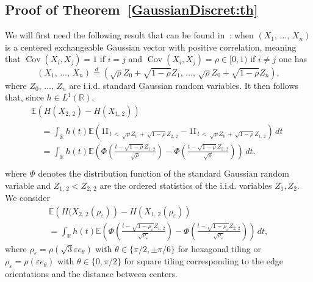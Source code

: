 \documentclass[10pt]{amsart}
\theoremstyle{definition}\newtheorem{defi}[theo]{Definition}\newtheorem{rema}[theo]{Remark}\newtheorem{exam}[theo]{Example}\newtheorem{exem}[theo]{Example}\newtheorem{nota}[theo]{Notation}
\newcommand{\R}{\mathbb{R}}
\newcommand{\E}{\mathbb{E}}
\newcommand{\ind}{{1\!\!\mathrm{I}}}
\newcommand{\eps}{\varepsilon}
\DeclareMathOperator{\Cov}{Cov}
\begin{document}
\subsection{Proof of Theorem~\ref{GaussianDiscret:th}}\label{App:GaussianDiscret:th}



We will first need the following result that can be found in~\cite[p.~139]{Tong90}: when $(X_1,\,\ldots,\,X_n)$ is a centered exchangeable Gaussian vector with positive correlation, meaning that $\Cov(X_i,X_j)=1$ if $i=j$ and $\Cov(X_i,X_j)=\rho \in [0,1)$ if $i\neq j$ one has
\[
\left(X_1,\,\ldots,\,X_n\right)\stackrel{d}{=}\left(\sqrt{\rho}Z_0+\sqrt{1-\rho}Z_1,\,\ldots,\,\sqrt{\rho}Z_0+\sqrt{1-\rho}Z_n\right),
\]
where $Z_0,\,\ldots,\,Z_n$ are i.i.d. standard Gaussian random variables. It then follows that, since $h\in L^1(\R)$,
\begin{multline*}
\E\left(H(X_{2,\,2}) - H(X_{1,\,2})\right)\\
\begin{aligned}
& = \int_\R h(t) \E \left(
\ind_{\,t\,<\,\sqrt{\rho}Z_0\,+\,\sqrt{1-\rho}Z_{2,\,2}}-\ind_{\,t\,<\,\sqrt{\rho}Z_0\,+\,\sqrt{1-\rho}Z_{1,\,2}}\right) \, dt \\
& = \int_\R h(t) \E\left(\Phi\left(\frac{t-\sqrt{1-\rho}Z_{1,\,2}}{\sqrt{\rho}}\right)-\Phi\left(\frac{t-\sqrt{1-\rho}Z_{2,\,2}}{\sqrt{\rho}}\right)\right)\,dt,\\
\end{aligned}
\end{multline*}
where $\Phi$ denotes the distribution function of the standard Gaussian random variable and $Z_{1,\,2}<Z_{2,\,2}$ are the ordered statistics of the i.i.d. variables $Z_1, Z_2$.\\
We consider
\begin{multline*}
\E\left(H(X_{2,\,2}(\rho_\eps)\right) - H\left(X_{1,\,2}(\rho_\eps)\right)
\\
=\int_\R h(t) \E\left(\Phi\left(\frac{t-\sqrt{1-\rho_\eps}Z_{1,\,2}}{\sqrt{\rho_\eps}}\right)-\Phi\left(\frac{t-\sqrt{1-\rho_\eps}Z_{2,\,2}}{\sqrt{\rho_\eps}}\right)\right)\,dt,
\end{multline*}
where $\rho_\eps=\rho(\sqrt{3}\eps e_{\theta})$ with $\theta\in\{\pi/2,\pm\pi/6\}$ for hexagonal tiling or $\rho_\eps=\rho(\eps e_{\theta})$ with $\theta\in\{0,\pi/2\}$ for square tiling corresponding to the edge orientations and the distance between centers.
\end{document}
